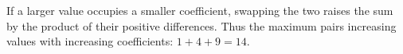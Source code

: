 If a larger value occupies a smaller coefficient, swapping the two raises the sum by the product of their positive differences. Thus the maximum pairs increasing values with increasing coefficients: $ 1+4+9=\boxed{14}$.
